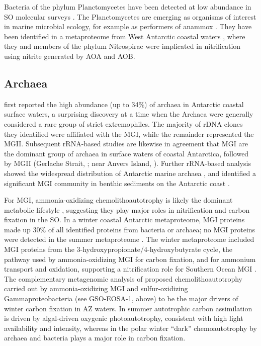 Bacteria of the phylum Planctomycetes have been detected at low abundance in \ac{SO} molecular surveys \cite{Gentile:2006ef,LopezGarcia:2001vp,Jamieson:2012up,Murray:2011ib,Abell:2005ji}.
The Planctomycetes are emerging as organisms of interest in marine microbial ecology, for example as performers of \ac{anammox} \cite{Strous:1999wj}.
They have been identified in a metaproteome from West Antarctic coastal waters \cite{Williams:2012bs}, where they and members of the phylum Nitrospirae were implicated in nitrification using nitrite generated by \ac{AOA} and \ac{AOB}.

\subsection{Archaea}

\citet{DeLong:1994id} first reported the high abundance (up to 34\%) of archaea in Antarctic coastal surface waters, a surprising discovery at a time when the Archaea were generally considered a rare group of strict extremophiles.
The majority of rDNA clones they identified were affiliated with the \ac{MGI}, while the remainder represented the \ac{MGII}.
Subsequent rRNA-based studies are likewise in agreement that \ac{MGI} are the dominant group of archaea in surface waters of coastal Antarctica, followed by \ac{MGII} (Gerlache Strait, \citet{Massana:1998tn}; near Anvers Island, \citet{Murray:1998wy}).
Further rRNA-based analysis showed the widespread distribution of Antarctic marine archaea \cite{Murray:1999tx,Topping:2006ul,Jamieson:2012up}, and identified a significant \ac{MGI} community in benthic sediments on the Antarctic coast \cite{Bowman:2003fa}.

For \ac{MGI}, ammonia-oxidizing chemolithoautotrophy is likely the dominant metabolic lifestyle \cite{Ingalls:2006kv,Berg:2007fj}, suggesting they play major roles in nitrification and carbon fixation in the \ac{SO}.
In a winter coastal Antarctic metaproteome, \ac{MGI} proteins made up 30\% of all identified proteins from bacteria or archaea; no \ac{MGI} proteins were detected in the summer metaproteome \cite{Williams:2012bs}.
The winter metaproteome included \ac{MGI} proteins from the 3-hydroxypropionate/4-hydroxybutyrate cycle, the pathway used by ammonia-oxidizing \ac{MGI} for carbon fixation, and for ammonium transport and oxidation, supporting a nitrification role for Southern Ocean \ac{MGI} \cite{Williams:2012bs}.
The complementary metagenomic analysis of \citet{Grzymski:2012ej} proposed chemolithoautotrophy carried out by ammonia-oxidizing \ac{MGI} and sulfur-oxidizing Gammaproteobacteria (see GSO-EOSA-1, above) to be the major drivers of winter carbon fixation in \ac{AZ} waters.
In summer autotrophic carbon assimilation is driven by algal-driven oxygenic photoautotrophy, consistent with high light availability and intensity, whereas in the polar winter ``dark'' chemoautotrophy by archaea and bacteria plays a major role in carbon fixation.

